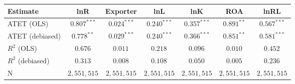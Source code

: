 \begin{tabular}{l*{6}{c}}
\hline\hline
 Estimate & lnR & Exporter & lnL & lnK & ROA & lnRL \\
\hline
ATET (OLS) & $0.807^{***}$ & $0.024^{***}$ & $0.240^{***}$ & $0.357^{***}$ & $0.891^{**}$ & $0.567^{***}$ \\
ATET (debiased) & $0.778^{**}$ & $0.029^{***}$ & $0.240^{***}$ & $0.366^{***}$ & $0.851^{**}$ & $0.581^{***}$ \\
\addlinespace $ R^2$ (OLS) & $0.676^{}$ & $0.011^{}$ & $0.218^{}$ & $0.096^{}$ & $0.010^{}$ & $0.452^{}$ \\
$ R^2$ (debiased) & $0.313^{}$ & $0.008^{}$ & $0.108^{}$ & $0.050^{}$ & $0.005^{}$ & $0.236^{}$ \\
N & $2,551,515$ & $2,551,515$ & $2,551,515$ & $2,551,515$ & $2,551,515$ & $2,551,515$ \\
\hline\hline
\end{tabular}
